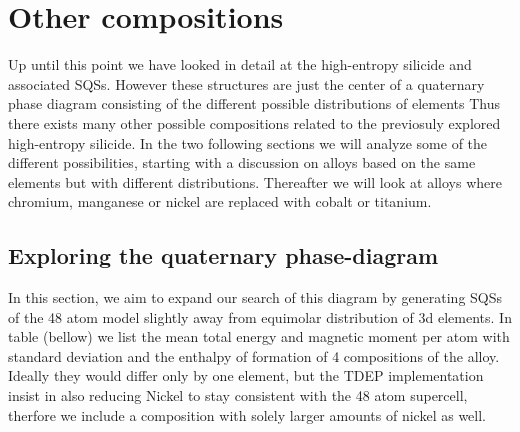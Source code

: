 \chapter{Other compositions}
\label{sec:comps}

Up until this point we have looked in detail at the high-entropy silicide  and associated SQSs. However these structures are just the center of a quaternary phase diagram consisting of the different possible distributions of elements Thus there exists many other possible compositions related to the previosuly explored  high-entropy silicide. In the two following sections we will analyze some of the different possibilities, starting with a discussion on alloys based on the same elements but with different distributions. Thereafter we will look at alloys where chromium, manganese or nickel are replaced with cobalt or titanium. 

\section{Exploring the quaternary phase-diagram}
In this section, we aim to expand our search of this diagram by generating SQSs of the 48 atom model slightly away from equimolar distribution of 3d elements. In table (bellow) we list the mean total energy and magnetic moment per atom with standard deviation and the enthalpy of formation of 4 compositions of the  alloy. Ideally they would differ only by one element, but the TDEP implementation insist in also reducing Nickel to stay consistent with the 48 atom supercell, therfore we include a composition with solely larger amounts of nickel as well. 

